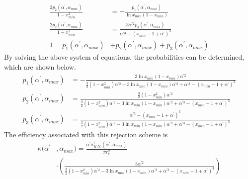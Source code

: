 \begin{align}
  \frac{2p_2(\alpha^{'},\alpha_{max})}{1-x_{min}^2} & = 
  -\frac{p_1(\alpha^{'},\alpha_{max})}{\ln{x_{min}}\left(1-x_{min}\right)} \\
  \frac{2p_2(\alpha^{'},\alpha_{max})}{1-x_{min}^2} & = 
  \frac{3\alpha^{'2}p_3(\alpha^{'},\alpha_{max})}
       {\alpha^{'3} - \left(x_{min}-1+\alpha^{'}\right)^3} \\
  1 = p_1(\alpha^{'},\alpha_{max}) & + p_2(\alpha^{'},\alpha_{max}) +
  p_3(\alpha^{'},\alpha_{max})
\end{align}
By solving the above system of equations, the probabilities can be determined, 
which are shown below.
\begin{align}
  p_1(\alpha^{'},\alpha_{max}) & = 
  -\frac{3\ln{x_{min}}\left(1-x_{min}\right)\alpha^{'2}}
  {\frac{3}{2}\left(1-x_{min}^2\right)\alpha^{'2} - 
    3\ln{x_{min}}\left(1-x_{min}\right)\alpha^{'2} + \alpha^{'3} - 
    \left(x_{min}-1+\alpha^{'}\right)^3} \\
  p_2(\alpha^{'},\alpha_{max}) & = 
  \frac{\frac{3}{2}\left(1-x_{min}^2\right)\alpha^{'2}}
  {\frac{3}{2}\left(1-x_{min}^2\right)\alpha^{'2} - 
    3\ln{x_{min}}\left(1-x_{min}\right)\alpha^{'2} + \alpha^{'3} - 
    \left(x_{min}-1+\alpha^{'}\right)^3} \\
  p_3(\alpha^{'},\alpha_{max}) & =
  \frac{\alpha^{'3} - \left(x_{min}-1+\alpha^{'}\right)^3}
  {\frac{3}{2}\left(1-x_{min}^2\right)\alpha^{'2} - 
    3\ln{x_{min}}\left(1-x_{min}\right)\alpha^{'2} + \alpha^{'3} - 
    \left(x_{min}-1+\alpha^{'}\right)^3}
\end{align}
The efficiency associated with this rejection scheme is 
\begin{align}
  \kappa(\alpha^{'}&,\alpha_{max}) = 
  \frac{\alpha^{'}\sigma_{K.N.}^{\dagger}(\alpha^{'},\alpha_{max})}{\pi r_e^2}
  \nonumber \\
  &\cdot \left(\frac{3\alpha^{'2}}{\frac{3}{2}\left(1-x_{min}^2\right)\alpha^{'2} 
    -3\ln{x_{min}}\left(1-x_{min}\right)\alpha^{'2} + \alpha^{'3} - 
    \left(x_{min}-1+\alpha^{'}\right)^3}\right)
\end{align}
  
